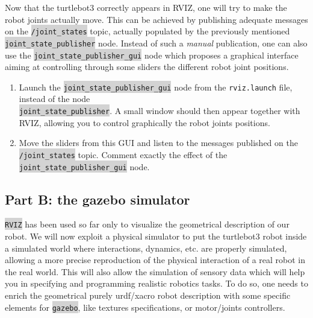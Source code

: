 \documentclass[10pt,a4paper]{upmc}
\newcounter{mainmemorder}
\newcommand{\load}{\setcounter{enumi}{\value{mainmemorder}}}
\newcommand{\mytext}[1]{\colorbox{lightgray}{\texttt{#1}}}
\begin{document}
Now that the turtlebot3 correctly appears in RVIZ, one will try to make the robot joints actually
move. This can be achieved by publishing adequate messages on the \mytext{/joint\_states}
topic, actually populated by the previously mentioned \mytext{joint\_state\_publisher} node. Instead
of such a \textit{manual} publication, one can also use the \mytext{joint\_state\_publisher\_gui}
node which proposes a graphical interface aiming at controlling through some sliders the different
robot joint positions.

\begin{enumerate}
  \load
  \item Launch the \mytext{joint\_state\_publisher\_gui} node from the \texttt{rviz.launch} file,
        instead of the node \\
        \mytext{\mytext{joint\_state\_publisher}}. A small window should then appear
        together with RVIZ, allowing you to control graphically the robot joints positions.

  \item Move the sliders from this GUI and listen to the messages published on the
        \mytext{/joint\_states} topic. Comment exactly the effect of the
        \mytext{joint\_state\_publisher\_gui} node.

\end{enumerate}

\subsection{Part B: the gazebo simulator}

\indent \mytext{RVIZ} has been used so far only to visualize the geometrical description of our
robot. We will now exploit a physical simulator to put the turtlebot3 robot inside a simulated world
where interactions, dynamics, etc. are properly simulated, allowing a more precise reproduction of
the physical interaction of a real robot in the real world. This will also allow the simulation of
sensory data which will help you in specifying and programming realistic robotics tasks.
%
To do so, one needs to enrich the geometrical purely urdf/xacro robot description with some specific
elements for \mytext{gazebo}, like textures specifications, or motor/joints controllers.
\end{document}
